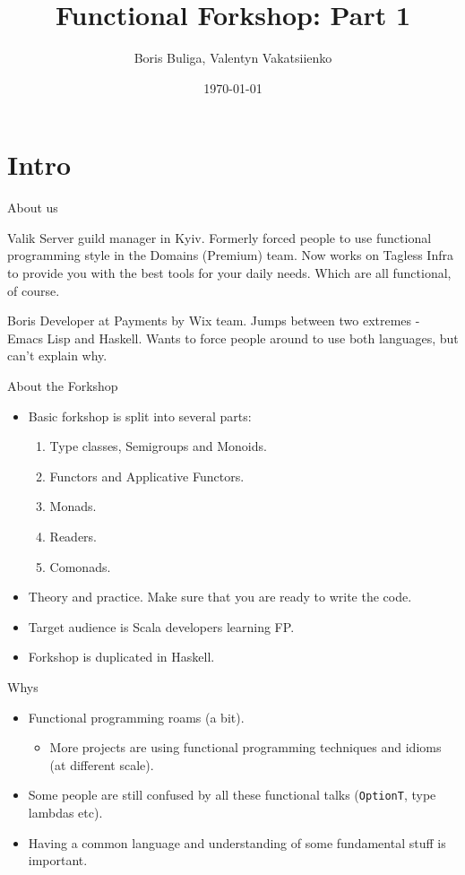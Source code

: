 \documentclass[presentation,aspectratio=169,smaller]{beamer}
\author{Boris Buliga, Valentyn Vakatsiienko}
\date{\today}
\title{Functional Forkshop: Part 1}
\begin{document}
\maketitle

\section*{Intro}
\label{sec:orgc4e6658}

\begin{frame}[label={sec:orge26541a}]{About us}
\begin{block}{Valik}
Server guild manager in Kyiv. Formerly forced people to use functional
programming style in the Domains (Premium) team. Now works on Tagless Infra to
provide you with the best tools for your daily needs. Which are all functional,
of course.

\pause
\end{block}

\begin{block}{Boris}
Developer at Payments by Wix team. Jumps between two extremes - Emacs Lisp and
Haskell. Wants to force people around to use both languages, but can't explain
why.
\end{block}
\end{frame}

\begin{frame}[label={sec:org7c8f408}]{About the Forkshop}
\begin{itemize}
\item Basic forkshop is split into several parts:
\begin{enumerate}
\item Type classes, Semigroups and Monoids.
\item Functors and Applicative Functors.
\item Monads.
\item Readers.
\item Comonads.
\end{enumerate}
\item Theory and practice. Make sure that you are ready to write the code.
\item Target audience is Scala developers learning FP.
\item Forkshop is duplicated in Haskell.
\end{itemize}
\end{frame}

\begin{frame}[label={sec:orgd3d0ab1},fragile]{Whys}
 \begin{itemize}
\item Functional programming roams (a bit).
\begin{itemize}
\item More projects are using functional programming techniques and idioms (at
different scale).
\end{itemize}
\item Some people are still confused by all these functional talks (\texttt{OptionT}, type
lambdas etc).
\item Having a common language and understanding of some fundamental stuff is
important.
\end{itemize}
\end{frame}
\end{document}
